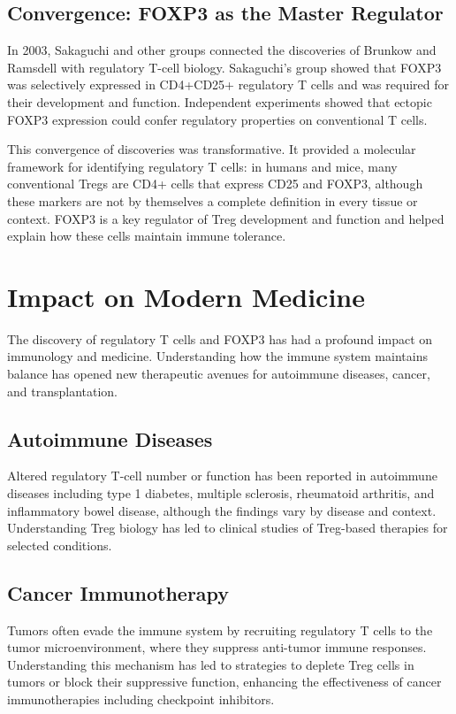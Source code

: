\subsection{Convergence: FOXP3 as the Master Regulator}

In 2003, Sakaguchi and other groups connected the discoveries of Brunkow and Ramsdell with regulatory T-cell biology. Sakaguchi's group showed that FOXP3 was selectively expressed in CD4+CD25+ regulatory T cells and was required for their development and function. Independent experiments showed that ectopic FOXP3 expression could confer regulatory properties on conventional T cells.

This convergence of discoveries was transformative. It provided a molecular framework for identifying regulatory T cells: in humans and mice, many conventional Tregs are CD4+ cells that express CD25 and FOXP3, although these markers are not by themselves a complete definition in every tissue or context. FOXP3 is a key regulator of Treg development and function and helped explain how these cells maintain immune tolerance.

\section{Impact on Modern Medicine}

The discovery of regulatory T cells and FOXP3 has had a profound impact on immunology and medicine. Understanding how the immune system maintains balance has opened new therapeutic avenues for autoimmune diseases, cancer, and transplantation.

\subsection{Autoimmune Diseases}

Altered regulatory T-cell number or function has been reported in autoimmune diseases including type 1 diabetes, multiple sclerosis, rheumatoid arthritis, and inflammatory bowel disease, although the findings vary by disease and context. Understanding Treg biology has led to clinical studies of Treg-based therapies for selected conditions.

\subsection{Cancer Immunotherapy}

Tumors often evade the immune system by recruiting regulatory T cells to the tumor microenvironment, where they suppress anti-tumor immune responses. Understanding this mechanism has led to strategies to deplete Treg cells in tumors or block their suppressive function, enhancing the effectiveness of cancer immunotherapies including checkpoint inhibitors.

